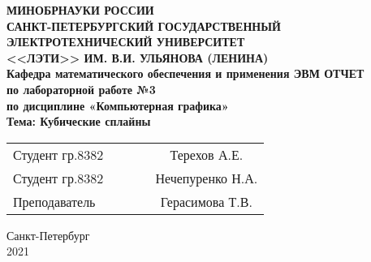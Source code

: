 \begin{titlepage}

\begin{center}
\textbf{
МИНОБРНАУКИ РОССИИ \\
САНКТ-ПЕТЕРБУРГСКИЙ ГОСУДАРСТВЕННЫЙ \\
ЭЛЕКТРОТЕХНИЧЕСКИЙ УНИВЕРСИТЕТ \\
<<ЛЭТИ>> ИМ. В.И. УЛЬЯНОВА (ЛЕНИНА) \\
Кафедра математического обеспечения и применения ЭВМ
\vfill
ОТЧЕТ\\
по лабораторной работе №3\\
по дисциплине «Компьютерная графика»\\
Тема: Кубические сплайны
\vfill
}
\begin{tabular}{ l c c c c }
 Студент гр.8382 & \hspace{2cm} & \underline{\hspace{4cm}} & \hspace{1cm} & Терехов А.Е. \\
 Студент гр.8382 & \hspace{2cm} & \underline{\hspace{4cm}} & \hspace{1cm} & Нечепуренко Н.А. \\
 Преподаватель & \hspace{2cm} & \underline{\hspace{4cm}} & \hspace{1cm} & Герасимова Т.В.
\end{tabular}

\vspace{3cm}

Санкт-Петербург\\
2021
\end{center}

\end{titlepage}
